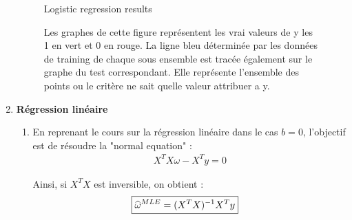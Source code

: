 \documentclass{article}
\begin{document}
\begin{enumerate}
\begin{figure}[h!]
    \label{fig:reglin}
    \caption{Logistic regression results}
    \caption*{Les graphes de cette figure représentent les vrai valeurs de y les 1 en vert et 0 en rouge. La ligne bleu déterminée par les données de training de chaque sous ensemble est tracée également sur le graphe du test correspondant. Elle représente l'ensemble des points ou le critère ne sait quelle valeur attribuer a y.}
\end{figure}
\newpage
\item \textbf{Régression linéaire}\\
\begin{enumerate}
\item En reprenant le cours sur la régression linéaire dans le cas $b = 0$, l'objectif est de résoudre la "normal equation" : \begin{align*}
X^{T}X\omega-X^{T}y=0
\end{align*}

Ainsi, si $X^{T}X$ est inversible, on obtient :
\begin{align*}
\Aboxed{\widehat{\omega}^{MLE} = (X^{T}X)^{-1}X^{T}y}
\end{align*}


\end{enumerate}
\end{enumerate}
\end{document}
